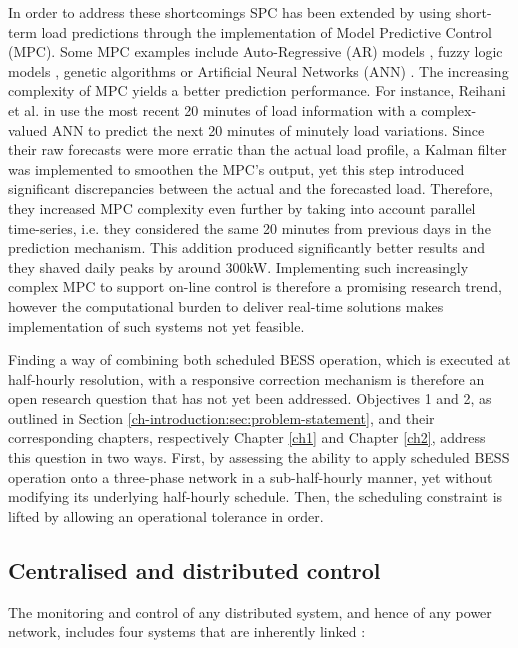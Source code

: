 In order to address these shortcomings SPC has been extended by using short-term load predictions through the implementation of Model Predictive Control (MPC).
Some MPC examples include Auto-Regressive (AR) models \cite{Li2009, Nie2011}, fuzzy logic models \cite{Sannomiya2001, Chen2013a}, genetic algorithms \cite{Xia2015a, Liu2015} or Artificial Neural Networks (ANN) \cite{Kalogirou2014, Quan2014, Lee2014, Pezeshki2014, Vaz2016, Reihani2016, Xiao2017}.
The increasing complexity of MPC yields a better prediction performance.
For instance, Reihani et al. in \cite{Reihani2016} use the most recent 20 minutes of load information with a complex-valued ANN to predict the next 20 minutes of minutely load variations.
Since their raw forecasts were more erratic than the actual load profile, a Kalman filter was implemented to smoothen the MPC's output, yet this step introduced significant discrepancies between the actual and the forecasted load.
Therefore, they increased MPC complexity even further by taking into account parallel time-series, i.e. they considered the same 20 minutes from previous days in the prediction mechanism.
This addition produced significantly better results and they shaved daily peaks by around 300kW.
Implementing such increasingly complex MPC to support on-line control is therefore a promising research trend, however the computational burden to deliver real-time solutions makes implementation of such systems not yet feasible.

Finding a way of combining both scheduled BESS operation, which is executed at half-hourly resolution, with a responsive correction mechanism is therefore an open research question that has not yet been addressed.
Objectives 1 and 2, as outlined in Section \ref{ch-introduction:sec:problem-statement}, and their corresponding chapters, respectively Chapter \ref{ch1} and Chapter \ref{ch2}, address this question in two ways.
First, by assessing the ability to apply scheduled BESS operation onto a three-phase network in a sub-half-hourly manner, yet without modifying its underlying half-hourly schedule.
Then, the scheduling constraint is lifted by allowing an operational tolerance in order.

\subsection{Centralised and distributed control}
\label{ch-literature:subsec:centralised-and-distributed-control}

The monitoring and control of any distributed system, and hence of any power network, includes four systems that are inherently linked \cite{Mansouri-Samani1993}:

